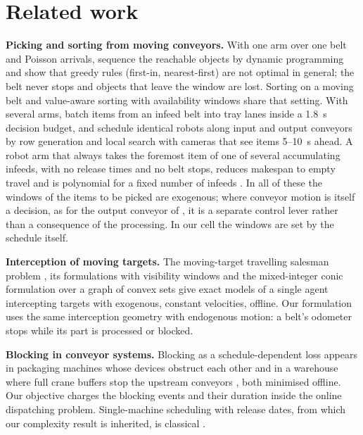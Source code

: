\documentclass[11pt,a4paper]{article}
\theoremstyle{plain}
\theoremstyle{definition}
\theoremstyle{remark}
\begin{document}
\section{Related work}\label{sec:related}
\textbf{Picking and sorting from moving conveyors.} With one arm over one belt and
Poisson arrivals, \cite{S02_Han2020} sequence the reachable objects by dynamic
programming and show that greedy rules (first-in, nearest-first) are not optimal in
general; the belt never stops and objects that leave the window are lost. Sorting on a
moving belt \cite{S01_Mattone2000} and value-aware sorting with availability windows
\cite{S05_Kokkalis2026} share that setting. With several arms, \cite{S03_Nielsen2023}
batch items from an infeed belt into tray lanes inside a 1.8~s decision budget, and
\cite{S04_Schettini2023} schedule identical robots along input and output conveyors by
row generation and local search with cameras that see items 5--10~s ahead. A robot arm
that always takes the foremost item of one of several accumulating infeeds, with no
release times and no belt stops, reduces makespan to empty travel and is polynomial for a
fixed number of infeeds \cite{Li2026}. In all of these the windows of the items to be
picked are exogenous; where conveyor motion is itself a decision, as for the output
conveyor of \cite{S04_Schettini2023}, it is a separate control lever rather than a
consequence of the processing. In our cell the windows are set by the schedule itself.

\textbf{Interception of moving targets.} The moving-target travelling salesman problem
\cite{S06_Helvig2003}, its formulations with visibility windows \cite{S07_Stieber2022}
and the mixed-integer conic formulation over a graph of convex sets \cite{S08_Philip2024}
give exact models of a single agent intercepting targets with exogenous, constant
velocities, offline. Our formulation uses the same interception geometry with endogenous
motion: a belt's odometer stops while its part is processed or blocked.

\textbf{Blocking in conveyor systems.} Blocking as a schedule-dependent loss appears in
packaging machines whose devices obstruct each other \cite{S10_Briskorn2025} and in a
warehouse where full crane buffers stop the upstream conveyors \cite{S11_SalviaHornos2026},
both minimised offline. Our objective charges the blocking events and their duration
inside the online dispatching problem. Single-machine scheduling with release dates, from
which our complexity result is inherited, is classical \cite{Lenstra1977,Schrage1968,Baker1974}.
\end{document}
